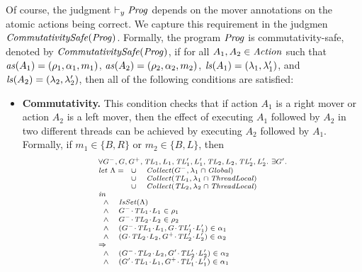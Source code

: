 Of course, the judgment $\vdash_y \mathit{Prog}$ depends on the mover annotations on the atomic actions being correct.
We capture this requirement in the judgmen $\mathit{CommutativitySafe}(\mathit{Prog})$.
Formally, the program $\mathit{Prog}$ is commutativity-safe, denoted by $\mathit{CommutativitySafe}(\mathit{Prog})$,
if for all $A_1,A_2 \in \mathit{Action}$ such that $\mathit{as}(A_1) = (\rho_1,\alpha_1,m_1)$, $\mathit{as}(A_2) = (\rho_2,\alpha_2,m_2)$,
$\mathit{ls}(A_1) = (\lambda_1,\lambda'_1)$, and $\mathit{ls}(A_2) = (\lambda_2,\lambda'_2)$, 
then all of the following conditions are satisfied:
\begin{itemize}
\item {\bf Commutativity.}
This condition checks that if action $A_1$ is a right mover or action $A_2$ is a left mover,
then the effect of executing $A_1$ followed by $A_2$ in two different threads can be achieved by executing $A_2$ followed by $A_1$.
Formally, if $m_1 \in \{B,R\}$ or $m_2 \in \{B,L\}$, then 
\[
\scriptsize{
\begin{array}{l}
\forall \varsG^-,\varsG,\varsG^+,\varsTL_1,\varsL_1,\varsTL'_1,\varsL'_1,\varsTL_2,\varsL_2,\varsTL'_2,\varsL'_2.\ \exists \varsG'. \\
\mathit{let}\ \Lambda =
\begin{array}[t]{ll}
\cup & \Collect(\varsG^-, \lins_1 \cap \Global) \\
\cup & \Collect(\varsTL_1, \lins_1 \cap \ThreadLocal) \\
\cup & \Collect(\varsTL_2, \lins_2 \cap \ThreadLocal) 
\end{array} \\
\mathit{in} \\
\begin{array}{ll}
\wedge & \IsSet(\Lambda) \\
\wedge & \MakeStore{\varsG^-}{\varsTL_1}{\varsL_1} \in \rho_1 \\
\wedge & \MakeStore{\varsG^-}{\varsTL_2}{\varsL_2} \in \rho_2 \\
\wedge & (\MakeStore{\varsG^-}{\varsTL_1}{\varsL_1},\MakeStore{\varsG}{\varsTL'_1}{\varsL'_1}) \in \alpha_1 \\
\wedge & (\MakeStore{\varsG}{\varsTL_2}{\varsL_2},\MakeStore{\varsG^+}{\varsTL'_2}{\varsL'_2}) \in \alpha_2 \\
\end{array} \\
\Rightarrow \\
\begin{array}{ll}
\wedge & (\MakeStore{\varsG^-}{\varsTL_2}{\varsL_2},\MakeStore{\varsG'}{\varsTL'_2}{\varsL'_2}) \in \alpha_2 \\
\wedge & (\MakeStore{\varsG'}{\varsTL_1}{\varsL_1},\MakeStore{\varsG^+}{\varsTL'_1}{\varsL'_1}) \in \alpha_1 \\
\end{array}
\end{array}
}
\]


\end{itemize}
